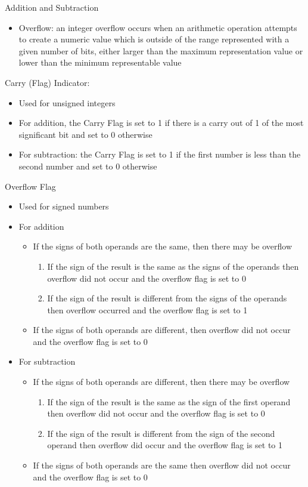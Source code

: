 \documentclass[12pt]{article}
\begin{document}
 Addition and Subtraction \begin{itemize} 
 \item Overflow: an integer overflow occurs when an arithmetic operation attempts to create a numeric value which is outside of the range represented with a given number of bits, either larger than the maximum representation value or lower than the minimum representable value
 \end{itemize}
 
 Carry (Flag) Indicator: \begin{itemize}
 \item Used for unsigned integers
\item For addition, the Carry Flag is set to 1 if there is a carry out of 1 of the most significant bit and set to 0 otherwise 
\item For subtraction: the Carry Flag is set to 1 if the first number is less than the second number and set to 0 otherwise 
\end{itemize} 

Overflow Flag \begin{itemize}
\item Used for signed numbers 
\item For addition \begin{itemize} 
\item If the signs of both operands are the same, then there may be overflow \begin{enumerate} 
\item If the sign of the result is the same as the signs of the operands then overflow did not occur and the overflow flag is set to 0 
\item If the sign of the result is different from the signs of the operands then overflow occurred and the overflow flag is set to 1
\end{enumerate} 
\item If the signs of both operands are different, then overflow did not occur and the overflow flag is set to 0 
\end{itemize} 
\item For subtraction \begin{itemize} 
\item If the signs of both operands are different, then there may be overflow \begin{enumerate}
\item If the sign of the result is the same as the sign of the first operand then overflow did not occur and the overflow flag is set to 0
\item If the sign of the result is different from the sign of the second operand then overflow did occur and the overflow flag is set to 1
\end{enumerate}
\item If the signs of both operands are the same then overflow did not occur and the overflow flag is set to 0 
\end{itemize} \end{itemize}
\end{document}
